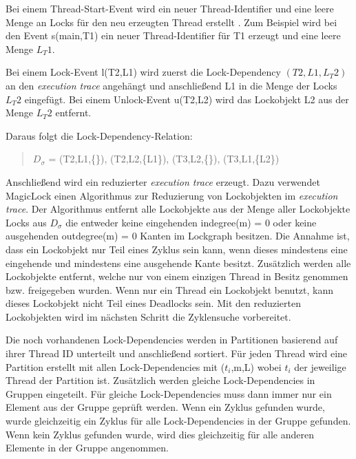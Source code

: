 Bei einem Thread-Start-Event wird ein neuer Thread-Identifier und eine leere
Menge an Locks für den neu erzeugten Thread erstellt
\autocite[vgl.][4]{MagicLock}. Zum Beispiel wird bei den Event \textrm{s(main,T1)}
ein neuer Thread-Identifier für \textrm{T1} erzeugt und eine leere Menge
\textrm{$L_T1$}.

Bei einem Lock-Event \textrm{l(T2,L1)} wird zuerst die Lock-Dependency
\textrm{$(T2,L1,L_T2)$} an den \emph{execution trace} angehängt und anschließend
\textrm{L1} in die Menge der Locks
\textrm{$L_T2$} eingefügt. Bei einem Unlock-Event \textrm{u(T2,L2)}
wird das Lockobjekt \textrm{L2} aus der Menge \textrm{$L_T2$}
entfernt.\autocite[vgl.][4]{MagicLock}

Daraus folgt die Lock-Dependency-Relation:
\begin{quote}
  \textbf{$D_\sigma$} = (T2,L1,\{\}), (T2,L2,\{L1\}), (T3,L2,\{\}),
  (T3,L1,\{L2\})
\end{quote}
Anschließend wird ein reduzierter \emph{execution trace} erzeugt. Dazu verwendet
MagicLock einen Algorithmus zur Reduzierung von Lockobjekten im \emph{execution
trace}. Der Algorithmus entfernt alle Lockobjekte aus der Menge aller
Lockobjekte \textrm{Locks} aus \textrm{$D_\sigma$} die entweder keine
eingehenden \textrm{indegree(m) = 0} oder keine ausgehenden \textrm{outdegree(m)
= 0} Kanten im Lockgraph besitzen. Die Annahme ist, dass ein Lockobjekt nur Teil
eines Zyklus sein kann, wenn dieses mindestens eine eingehende und mindestens
eine ausgehende Kante besitzt. Zusätzlich werden alle Lockobjekte entfernt,
welche nur von einem einzigen Thread in Besitz genommen bzw. freigegeben wurden.
Wenn nur ein Thread ein Lockobjekt benutzt, kann dieses Lockobjekt nicht Teil
eines Deadlocks sein. Mit den reduzierten Lockobjekten wird im nächsten Schritt
die Zyklensuche vorbereitet.\autocite[vgl.][4]{MagicLock}

Die noch vorhandenen Lock-Dependencies werden in Partitionen basierend auf ihrer
Thread ID unterteilt und anschließend sortiert. Für jeden Thread wird eine
Partition erstellt mit allen Lock-Dependencies mit \textrm{($t_i$,m,L)} wobei
\textrm{$t_i$} der jeweilige Thread der Partition ist. Zusätzlich werden gleiche
Lock-Dependencies in Gruppen eingeteilt. Für gleiche Lock-Dependencies muss dann
immer nur ein Element aus der Gruppe geprüft werden. Wenn ein Zyklus gefunden
wurde, wurde gleichzeitig ein Zyklus für alle Lock-Dependencies in der Gruppe
gefunden. Wenn kein Zyklus gefunden wurde, wird dies gleichzeitig für alle
anderen Elemente in der Gruppe angenommen.\autocite[vgl.][8-9]{MagicLock}

